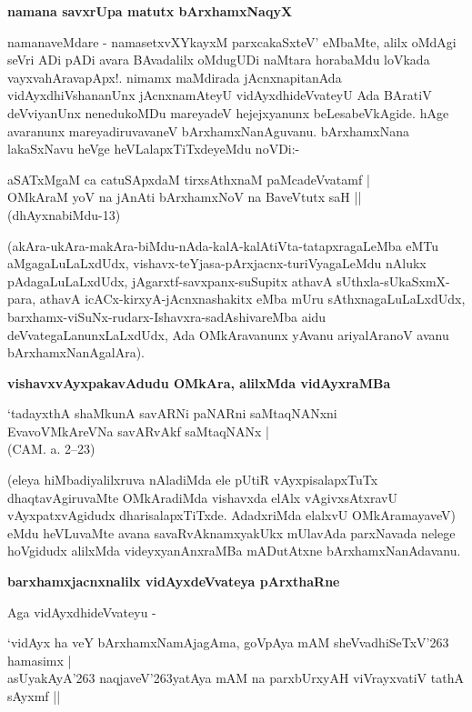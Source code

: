 \noindent
\textbf{namana savxrUpa matutx bArxhamxNaqyX}\label{page84}

namanaveMdare - namasetxvXYkayxM parxcakaSxteV' eMbaMte, alilx oMdAgi seVri ADi pADi avara BAvadalilx oMdugUDi naMtara horabaMdu loVkada vayxvahAravapApx!. nimamx maMdirada jAcnxnapitanAda vidAyxdhiVshananUnx jAcnxnamAteyU vidAyxdhideVvateyU Ada BAratiV deVviyanUnx nenedukoMDu mareyadeV hejejxyanunx beLesabeVkAgide. hAge avaranunx mareyadiruvavaneV bArxhamxNanAguvanu. bArxhamxNana lakaSxNavu heVge heVLalapxTiTxdeyeMdu noVDi:-

\begin{shloka}
aSATxMgaM ca catuSApxdaM tirxsAthxnaM paMcadeVvatamf |\\\label{48}
OMkAraM yoV na jAnAti bArxhamxNoV na BaveVtutx saH ||\\
(dhAyxnabiMdu-13)
\end{shloka}

(akAra-ukAra-makAra-biMdu-nAda-kalA-kalAtiVta-tatapxragaLeMba eMTu aMgagaLuLaLxdUdx, vishavx-teYjasa-pArxjacnx-turiVyagaLeMdu nAlukx pAdagaLuLaLxdUdx, jAgarxtf-savxpanx-suSupitx athavA sUthxla-sUkaSxmX-para, athavA icACx-kirxyA-jAcnxnashakitx eMba mUru sAthxnagaLuLaLxdUdx, barxhamx-viSuNx-rudarx-Ishavxra-sadAshivareMba aidu deVvategaLanunxLaLxdUdx, Ada OMkAravanunx yAvanu ariyalAranoV avanu bArxhamxNanAgalAra).

\noindent
\textbf{vishavxvAyxpakavAdudu OMkAra, alilxMda vidAyxraMBa}

\begin{shloka}
`tadayxthA shaMkunA savARNi paNARni saMtaqNANxni\\\label{84}
EvavoVMkAreVNa savARvAkf saMtaqNANx |\\
(CAM. a. 2--23)
\end{shloka}

(eleya hiMbadiyalilxruva nAladiMda ele pUtiR vAyxpisalapxTuTx dhaqtavAgiruvaMte OMkAradiMda vishavxda elAlx vAgivxsAtxravU vAyxpatxvAgidudx dharisalapxTiTxde. AdadxriMda elalxvU OMkAramayaveV) eMdu heVLuvaMte avana savaRvAknamxyakUkx mUlavAda parxNavada nelege hoVgidudx alilxMda videyxyanAnxraMBa mADutAtxne bArxhamxNanAdavanu.

\noindent
\textbf{barxhamxjacnxnalilx vidAyxdeVvateya pArxthaRne}\label{page85}

Aga vidAyxdhideVvateyu -

\begin{shloka}
`vidAyx ha veY bArxhamxNamAjagAma, goVpAya mAM sheVvadhiSeTxV\char'263 hamasimx |\\\label{85}
asUyakAyA\char'263 naqjaveV\char'263yatAya mAM na parxbUrxyAH viVrayxvatiV tathA sAyxmf ||
\end{shloka}


